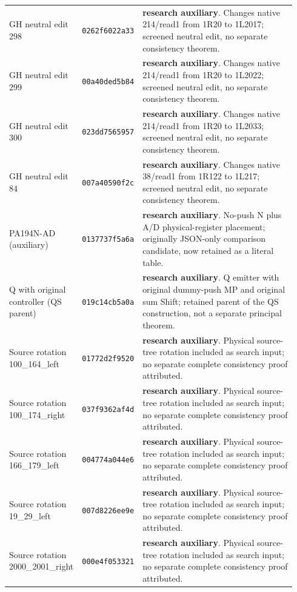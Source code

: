 {\begin{longtable}{@{}>{\raggedright\arraybackslash}p{0.23\linewidth}>{\raggedright\arraybackslash}p{0.145\linewidth}>{\raggedright\arraybackslash}p{0.56\linewidth}@{}}
GH neutral edit 298 & \texttt{0262f6022a33} & \textbf{research auxiliary}. Changes native 214/read1 from 1R20 to 1L2017; screened neutral edit, no separate consistency theorem.\\[4pt]
GH neutral edit 299 & \texttt{00a40ded5b84} & \textbf{research auxiliary}. Changes native 214/read1 from 1R20 to 1L2022; screened neutral edit, no separate consistency theorem.\\[4pt]
GH neutral edit 300 & \texttt{023dd7565957} & \textbf{research auxiliary}. Changes native 214/read1 from 1R20 to 1L2033; screened neutral edit, no separate consistency theorem.\\[4pt]
GH neutral edit 84 & \texttt{007a40590f2c} & \textbf{research auxiliary}. Changes native 38/read1 from 1R122 to 1L217; screened neutral edit, no separate consistency theorem.\\[4pt]
PA194N-AD (auxiliary) & \texttt{0137737f5a6a} & \textbf{research auxiliary}. No-push N plus A/D physical-register placement; originally JSON-only comparison candidate, now retained as a literal table.\\[4pt]
Q with original controller (QS parent) & \texttt{019c14cb5a0a} & \textbf{research auxiliary}. Q emitter with original dummy-push MP and original sum Shift; retained parent of the QS construction, not a separate principal theorem.\\[4pt]
Source rotation 100\_164\_left & \texttt{01772d2f9520} & \textbf{research auxiliary}. Physical source-tree rotation included as search input; no separate complete consistency proof attributed.\\[4pt]
Source rotation 100\_174\_right & \texttt{037f9362af4d} & \textbf{research auxiliary}. Physical source-tree rotation included as search input; no separate complete consistency proof attributed.\\[4pt]
Source rotation 166\_179\_left & \texttt{004774a044e6} & \textbf{research auxiliary}. Physical source-tree rotation included as search input; no separate complete consistency proof attributed.\\[4pt]
Source rotation 19\_29\_left & \texttt{007d8226ee9e} & \textbf{research auxiliary}. Physical source-tree rotation included as search input; no separate complete consistency proof attributed.\\[4pt]
Source rotation 2000\_2001\_right & \texttt{000e4f053321} & \textbf{research auxiliary}. Physical source-tree rotation included as search input; no separate complete consistency proof attributed.\\[4pt]

\end{longtable}}
